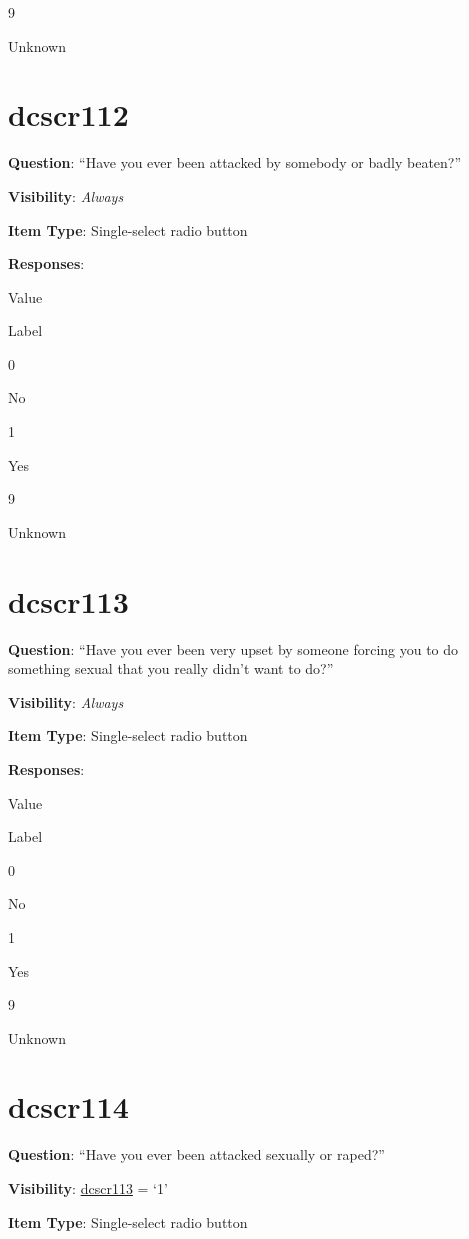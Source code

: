 \documentclass[]{book}
\begin{document}
9

Unknown

\hypertarget{dcscr112}{%
\section{dcscr112}\label{dcscr112}}

\textbf{Question}: ``Have you ever been attacked by somebody or badly beaten?''

\textbf{Visibility}: \emph{Always}

\textbf{Item Type}: Single-select radio button

\textbf{Responses}:

Value

Label

0

No

1

Yes

9

Unknown

\hypertarget{dcscr113}{%
\section{dcscr113}\label{dcscr113}}

\textbf{Question}: ``Have you ever been very upset by someone forcing you to do something sexual that you really didn't want to do?''

\textbf{Visibility}: \emph{Always}

\textbf{Item Type}: Single-select radio button

\textbf{Responses}:

Value

Label

0

No

1

Yes

9

Unknown

\hypertarget{dcscr114}{%
\section{dcscr114}\label{dcscr114}}

\textbf{Question}: ``Have you ever been attacked sexually or raped?''

\textbf{Visibility}: \protect\hyperlink{dcscr113}{dcscr113} = `1'

\textbf{Item Type}: Single-select radio button
\end{document}
